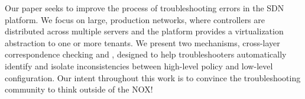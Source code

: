 Our paper seeks to improve the process of troubleshooting errors in the SDN
platform. We focus on large, production networks, 
where controllers are distributed across multiple servers
and the platform provides a virtualization abstraction to one or more tenants.
We present two mechanisms, cross-layer correspondence checking
and \simulator{}, designed to help troubleshooters automatically identify
and isolate inconsistencies between high-level policy and low-level
configuration. Our intent throughout this work is to convince
the troubleshooting community to think outside of the NOX!
